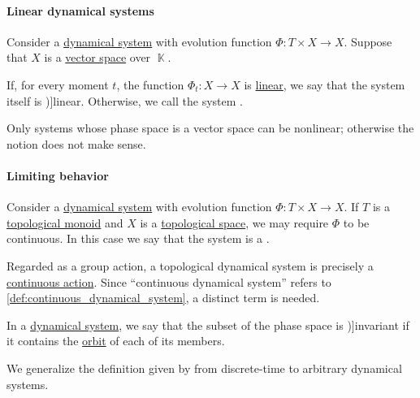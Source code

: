 \paragraph{Linear dynamical systems}

\begin{definition}\label{def:linear_dynamical_system}
  Consider a \hyperref[def:dynamical_system]{dynamical system} with evolution function \( \Phi: T \times X \to X \). Suppose that \( X \) is a \hyperref[def:vector_space]{vector space} over \( \BbbK \).

  If, for every moment \( t \), the function \( \Phi_t: X \to X \) is \hyperref[def:linear_function]{linear}, we say that the system itself is \term[ru=линейная (динамическая система) (\cite[11]{Юмагулов2015ДинамическиеСистемы})]{linear}. Otherwise, we call the system .
\end{definition}
\begin{comments}
  \item Only systems whose phase space is a vector space can be nonlinear; otherwise the notion does not make sense.
\end{comments}

\paragraph{Limiting behavior}

\begin{definition}\label{def:topological_dynamical_system}
  Consider a \hyperref[def:dynamical_system]{dynamical system} with evolution function \( \Phi: T \times X \to X \). If \( T \) is a \hyperref[def:topological_semigroup]{topological monoid} and \( X \) is a \hyperref[def:topological_space]{topological space}, we may require \( \Phi \) to be continuous. In this case we say that the system is a .
\end{definition}
\begin{comments}
  \item Regarded as a group action, a topological dynamical system is precisely a \hyperref[def:continuous_monoid_action]{continuous action}. Since \enquote{continuous dynamical system} refers to \cref{def:continuous_dynamical_system}, a distinct term is needed.
\end{comments}

\begin{definition}\label{def:dynamical_system_invariant_set}
  In a \hyperref[def:dynamical_system]{dynamical system}, we say that the subset of the phase space is \term[ru=инвариантное множество (\cite[94]{Юмагулов2015ДинамическиеСистемы})]{invariant} if it contains the \hyperref[def:dynamical_system_trajectory]{orbit} of each of its members.
\end{definition}
\begin{comments}
  \item We generalize the definition given by  from discrete-time to arbitrary dynamical systems.
\end{comments}

